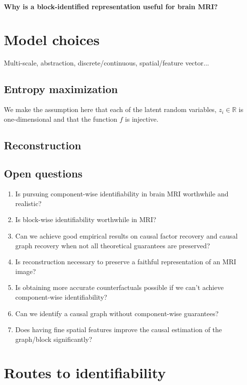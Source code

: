\documentclass{article}
\begin{document}
\paragraph{Why is a block-identified representation useful for brain MRI?}

\section{Model choices}
Multi-scale, abstraction, discrete/continuous, spatial/feature vector...

\subsection{Entropy maximization}
We make the assumption here that each of the latent random variables, $z_i \in \mathbb{R}$ is one-dimensional and that the function $f$ is injective.

\subsection{Reconstruction}



\subsection{Open questions}
\begin{enumerate}
    \item Is pursuing component-wise identifiability in brain MRI worthwhile and realistic?
    \item Is block-wise identifiability worthwhile in MRI?
    \item Can we achieve good empirical results on causal factor recovery and causal graph recovery when not all theoretical guarantees are preserved?
    \item Is reconstruction necessary to preserve a faithful representation of an MRI image?
    \item Is obtaining more accurate counterfactuals possible if we can't achieve component-wise identifiability?
    \item Can we identify a causal graph without component-wise guarantees?
    \item Does having fine spatial features improve the causal estimation of the graph/block significantly?

\end{enumerate}

\section{Routes to identifiability}
\end{document}
